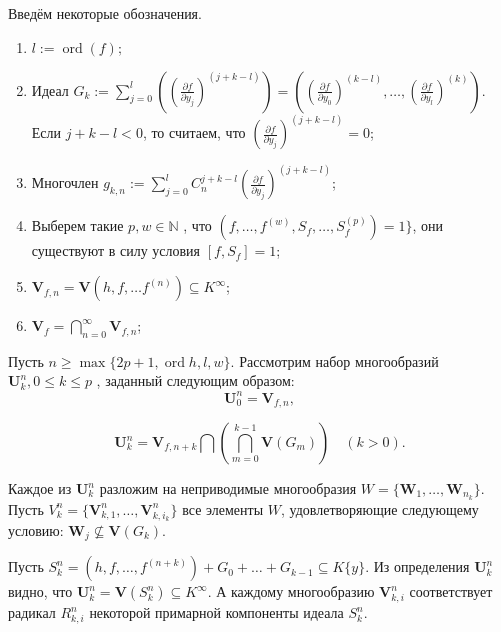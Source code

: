 \documentclass[16pt]{article}
\DeclareMathOperator{\ord}{ord}
\theoremstyle{plain}
\theoremstyle{definition}
\theoremstyle{remark}
\begin{document}
Введём некоторые обозначения.
\begin{enumerate}


  \item  $l:=\ord (f);$

  \item Идеал $G_k := \sum\limits_{j=0}^l\left(\left(\frac{\partial f}{\partial y_j}\right)^{(j+k-l)}\right) = \left(\left(\frac{\partial f}{\partial y_0}\right)^{(k-l)},\ldots ,\left(\frac{\partial f}{\partial y_l}\right)^{(k)} \right)$.
  \\Если $j+k-l<0$, то считаем, что $\left(\frac{\partial f}{\partial y_j}\right)^{(j+k-l)} = 0$;

  \item Многочлен $g_{k,n}:=\sum\limits_{j=0}^{l}C_n^{j+k - l }\left(\frac{\partial f}{\partial y_j}\right)^{(j+k - l)}$;

  \item  Выберем  такие $p,w\in \mathbb{N}$ , что $(f,\ldots,f^{(w)},S_f,\ldots,S_f^{(p)})=1\}$, они существуют в силу условия
  $[f,S_f]=1$;

  \item $\mathbf{V}_{f,n}=\mathbf{V}(h,f,\ldots f^{(n)})\subseteq K^{\infty}$;

  \item
  $\mathbf{V}_{f}=\bigcap\limits_{n=0}^{\infty}\mathbf{V}_{f,n}$;


\end{enumerate}



Пусть $n \geqslant\max\{ 2p+1,\ord{h},l,w\}$. Рассмотрим  набор многообразий $\mathbf{U}_k^n,0\leqslant k\leqslant p $ , заданный следующим образом:
$$
\mathbf{U}_{0}^n=\mathbf{V}_{f,n},
$$

$$\mathbf{U}_k^n=\mathbf{V}_{f,n+k}\bigcap\left(\bigcap\limits_{m=0}^{k-1}\mathbf{V}\left(G_m\right)\right)
\quad (k>0).
$$

Каждое из $\mathbf{U}^n_k$ разложим на неприводимые многообразия $W=\{\mathbf{W}_{1},\ldots,\mathbf{W}_{n_k}\}$. Пусть $V^n_k=\{\mathbf{V}^n_{k,1},\ldots,\mathbf{V}^n_{k,i_k}\}$ все элементы $W$, удовлетворяющие следующему условию: $\mathbf{W}_{j}\not\subseteq\mathbf{V}(G_k)$.

Пусть  $S_k^n=(h,f,\ldots,f^{(n+k)})+G_0+\ldots+ G_{k-1}\subseteq K\{y\}$. Из определения $\mathbf{U}_k^n$ видно, что $\mathbf{U}_k^n=\mathbf{V}(S_k^n)\subseteq K^{\infty}$. А каждому многообразию $\mathbf{V}_{k,i}^n$ соответствует радикал $R_{k,i}^n$ некоторой примарной компоненты идеала $S_k^n$.
\end{document}
